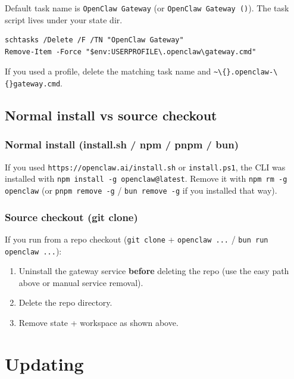 Default task name is \texttt{OpenClaw Gateway} (or \texttt{OpenClaw Gateway ()}).
The task script lives under your state dir.

\begin{lstlisting}
schtasks /Delete /F /TN "OpenClaw Gateway"
Remove-Item -Force "$env:USERPROFILE\.openclaw\gateway.cmd"
\end{lstlisting}


If you used a profile, delete the matching task name and \texttt{\textasciitilde{}\textbackslash\{\}.openclaw-\textbackslash\{\}gateway.cmd}.

\subsection{Normal install vs source checkout}


\subsubsection{Normal install (install.sh / npm / pnpm / bun)}


If you used \texttt{https://openclaw.ai/install.sh} or \texttt{install.ps1}, the CLI was installed with \texttt{npm install -g openclaw@latest}.
Remove it with \texttt{npm rm -g openclaw} (or \texttt{pnpm remove -g} / \texttt{bun remove -g} if you installed that way).

\subsubsection{Source checkout (git clone)}


If you run from a repo checkout (\texttt{git clone} + \texttt{openclaw ...} / \texttt{bun run openclaw ...}):

\begin{enumerate}
  \item Uninstall the gateway service \textbf{before} deleting the repo (use the easy path above or manual service removal).
  \item Delete the repo directory.
  \item Remove state + workspace as shown above.
\end{enumerate}



\clearpage

\section{Updating}


